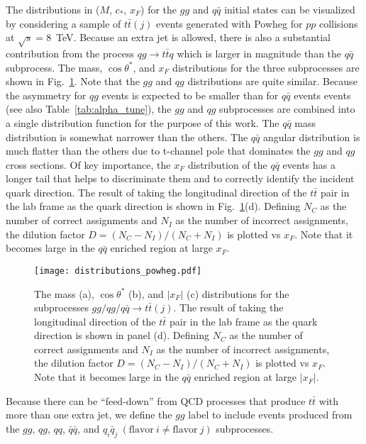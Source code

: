 \documentclass{cmspaperpdf}
\begin{document}
The distributions in ($M$, $c_*$, $x_F$) for the $gg$ and $q\bar q$ initial states can be visualized by considering a sample of $t\bar t(j)$ events generated with Powheg for $pp$ collisions at $\sqrt{s}=8$~TeV.  Because an extra jet is allowed, there is also a substantial contribution from the process $qg\to t\bar t q$ which is larger in magnitude than the $q\bar q$ subprocess.  The mass, $\cos\theta^*$, and $x_F$ distributions for the three subprocesses are shown in Fig.~\ref{fig:distributions}.  Note that the $gg$ and $qg$ distributions are quite similar.  Because the asymmetry for $qg$ events is expected to be smaller than for $q\bar q$ events events \cite{Kuhn:1998kw} (see also Table~\ref{tab:alpha_tune}), the $gg$ and $qg$ subprocesses are combined into a single distribution function for the purpose of this work.  The $q\bar q$ mass distribution is somewhat narrower than the others.  The $q\bar q$ angular distribution is much flatter than the others due to t-channel pole that dominates the $gg$ and $qg$ cross sections.  Of key importance, the $x_F$ distribution of the $q\bar q$ events has a longer tail that helps to discriminate them and to correctly identify the incident quark direction.  The result of taking the longitudinal direction of the $t\bar t$ pair in the lab frame as the quark direction is shown in Fig.~\ref{fig:distributions}(d).  Defining $N_C$ as the number of correct assignments and $N_I$ as the number of incorrect assignments, the dilution factor $D=(N_C-N_I)/(N_C+N_I)$ is plotted vs $x_F$.  Note that it becomes large in the $q\bar q$ enriched region at large $x_F$.
\begin{figure}[hbt]
  \begin{center}
    \texttt{[image: distributions\_powheg.pdf]}
  \caption{\small The mass (a), $\cos\theta^*$ (b), and $|x_F|$ (c) distributions for the subprocesses $gg/qg/q\bar q\to t\bar t(j)$.  The result of taking the longitudinal direction of the $t\bar t$ pair in the lab frame as the quark direction is shown in panel (d).  Defining $N_C$ as the number of correct assignments and $N_I$ as the number of incorrect assignments, the dilution factor $D=(N_C-N_I)/(N_C+N_I)$ is plotted vs $x_F$.  Note that it becomes large in the $q\bar q$ enriched region at large $|x_F|$.}
    \label{fig:distributions}
  \end{center}
\end{figure}

Because there can be ``feed-down'' from QCD processes that produce $t\bar t$ with more than one extra jet, we define the $gg$ label to include events produced from the $gg$, $qg$, $qq$, $\bar q \bar q$, and $q_i\bar q_j\ (\mathrm{flavor}\ i\neq \mathrm{flavor}\ j)$ subprocesses.
\end{document}

